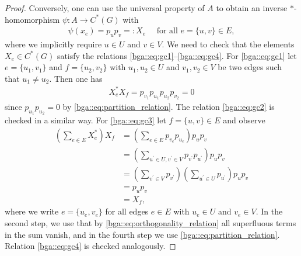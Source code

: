 \documentclass[a4paper]{amsart}
\begin{document}
\begin{proof}
    Conversely, one can use the universal property of $A$ to obtain an inverse $\ast$-homomorphism $\psi: A \to C^\ast(G)$ with
    \begin{align*}
        \psi(x_e) = p_u p_v =: X_e \quad \text{ for all } e = \{u, v\} \in E,
    \end{align*}
    where we implicitly require $u \in U$ and $v \in V$.
    We need to check that the elements $X_e \in C^\ast(G)$ satisfy the relations \eqref{bga::eq:gc1}--\eqref{bga::eq:gc4}. For \eqref{bga::eq:gc1} let $e = \{u_1, v_1\}$ and $f = \{u_2, v_2\}$ with $u_1, u_2 \in U$ and $v_1, v_2 \in V$ be two edges such that $u_1 \neq u_2$. Then one has
    \begin{align*}
        X_e^\ast X_f = p_{v_1} p_{u_1} p_{u_2} p_{v_2} = 0
    \end{align*}
    since $p_{u_1} p_{u_2} = 0$ by \eqref{bga::eq:partition_relation}. The relation \eqref{bga::eq:gc2} is checked in a similar way. For \eqref{bga::eq:gc3} let $f = \{u, v\} \in E$ and observe
    \begin{align*}
        \left( \sum_{e \in E} X_e^\ast \right) X_f 
            &= \left( \sum_{e \in E} p_{v_e} p_{u_e} \right) p_u p_v \\
            &= \left( \sum_{u^\prime \in U, v^\prime \in V} p_{v^\prime} p_{u^\prime} \right) p_u p_v \\
            &= \left( \sum_{v^\prime \in V} p_{v^\prime} \right) \left( \sum_{u^\prime \in U} p_{u^\prime} \right) p_u p_v \\
            &= p_u p_v \\
            &= X_f,
    \end{align*}
    where we write $e = \{u_e, v_e\}$ for all edges $e \in E$ with $u_e \in U$ and $v_e \in V$. In the second step, we use that by \eqref{bga::eq:orthogonality_relation} all superfluous terms in the sum vanish, and in the fourth step we use \eqref{bga::eq:partition_relation}. Relation \eqref{bga::eq:gc4} is checked analogously. 


\end{proof}
\end{document}
